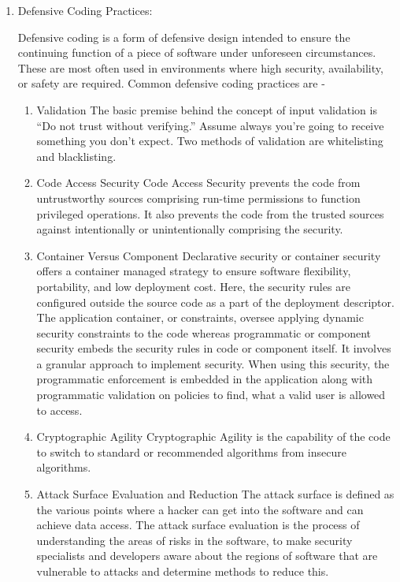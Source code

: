 \documentclass{article}
\begin{document}
\begin{enumerate}
    \item Defensive Coding Practices:
    
    Defensive coding is a form of defensive design intended to ensure the continuing function of a piece of software under unforeseen circumstances. These are most often used in environments where high security, availability, or safety are required.
    Common defensive coding practices are - 
    \begin{enumerate}
        \item Validation \newline
        The basic premise behind the concept of input validation is “Do not trust without verifying.” Assume always you’re going to receive something you don’t expect. Two methods of validation are whitelisting and blacklisting.
        
        \item Code Access Security \newline
        Code Access Security prevents the code from untrustworthy sources comprising run-time permissions to function privileged operations. It also prevents the code from the trusted sources against intentionally or unintentionally comprising the security.
        
        \item Container Versus Component\newline
        Declarative security or container security offers a container managed strategy to ensure software flexibility, portability, and low deployment cost. Here, the security rules are configured outside the source code as a part of the deployment descriptor. The application container, or constraints, oversee applying dynamic security constraints to the code whereas programmatic or component security embeds the security rules in code or component itself. It involves a granular approach to implement security. When using this security, the programmatic enforcement is embedded in the application along with programmatic validation on policies to find, what a valid user is allowed to access. 
        
        \item Cryptographic Agility \newline
        Cryptographic Agility is the capability of the code to switch to standard or recommended algorithms from insecure algorithms.
        
        \item Attack Surface Evaluation and Reduction \newline
        The attack surface is defined as the various points where a hacker can get into the software and can achieve data access. The attack surface evaluation is the process of understanding the areas of risks in the software, to make security specialists and developers aware about the regions of software that are vulnerable to attacks and determine methods to reduce this.
        

\end{enumerate}
\end{enumerate}
\end{document}
